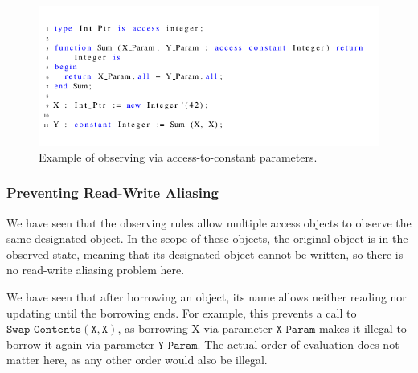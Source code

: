 \documentclass{llncs}
\newcommand\var[1]{\ensuremath{\mathtt{#1}}}
\begin{document}
\begin{figure}[htb!]
\centering
   \includegraphics[]{observe_ex1}
   \caption{Example of observing via access-to-constant parameters.}
   \label{fig:observe_exp}
\end{figure}



\subsubsection{Preventing Read-Write Aliasing}
\label{sec:noaliasing}

We have seen that the observing rules allow multiple access objects to observe the same designated object. In the scope of these objects, the original object is in the observed state, meaning that its designated object
cannot be written, so there is no read-write aliasing problem here.


We have seen that after borrowing an object, its name allows neither reading nor updating until the borrowing ends. For example, this prevents a call to \var{Swap\_Contents (X, X)},
as borrowing X via parameter \var{X\_Param} makes it illegal to borrow it again via parameter \var{Y\_Param}. The actual order of evaluation does not matter here, as any other order would also be illegal.
\end{document}
